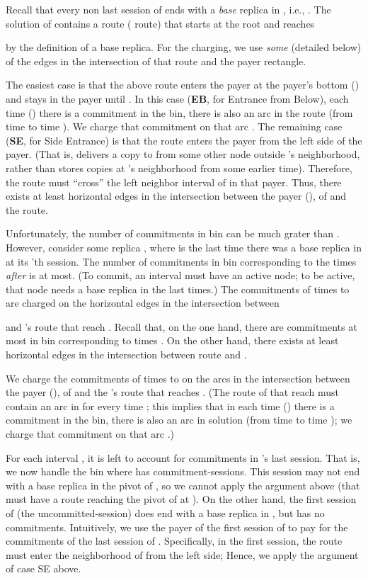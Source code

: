 \documentclass[11pt]{article}
\begin{document}
Recall that every non last session of  ends with a {\em base} replica in , i.e., .
The solution of  contains a route ( route) that starts at the root and reaches

by the definition of a base replica.
For the charging, we use {\em some} (detailed below) of the edges in the intersection of that  route and the payer rectangle.


The easiest case is that the above  route enters the payer at the payer's bottom () and stays in the payer until .
In this case ({\bf EB}, for Entrance from Below), each time () there is a commitment in the bin,
there is also an arc  in the  route (from time  to time ).
We charge that commitment on that arc .
The remaining case ({\bf SE}, for Side Entrance) is that
the  route enters the payer from the left side of the payer.
(That is,  delivers a copy to  from some other node  outside 's neighborhood,
rather than stores copies at 's neighborhood from some earlier time).
Therefore, the route must ``cross'' the left neighbor interval of  in that payer.
Thus, there exists at least  horizontal edges in the intersection between the payer (), of   and
the  route.

Unfortunately, the number of commitments in bin  can be much grater than .
However, consider some replica , where  is the last time there was a base replica in  at its 'th session.
The number of commitments in bin  corresponding to the times {\em after}  is  at most.
(To commit, an interval must have an active node; to be active, that node needs a base replica in the last  times.)
The commitments of times  to  are charged on the horizontal edges in the intersection between

and 's route that reach .
Recall that, on the one hand, there are  commitments at most in bin  corresponding to times .
On the other hand, there exists at least  horizontal edges in the intersection between  route and .

We charge the commitments of times  to  on the arcs
in the intersection between the payer (), of   and
the 's route that reaches .
(The route of  that reach  must contain an arc 
in  for every time ;
this implies that in each time () there is a commitment in the bin,
there is also an arc  in  solution (from time  to time );
we charge that commitment on that arc .)



For each interval , it is left to account for commitments in 's last session.
That is, we now handle the bin  where  has  commitment-sessions.
This session may not end with a base replica in the pivot of , so we cannot apply the argument above
(that  must have a route reaching the pivot of  at ).
On the other hand, the first session of  (the uncommitted-session) does end with a base replica in , but has no commitments.
Intuitively, we use the payer of the first session of  to pay for the commitments of the last session of .
Specifically, in the first session, the  route must enter the neighborhood of  from the left side;
Hence, we apply the argument of case SE above.
\end{document}
